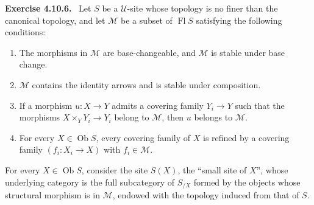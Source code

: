 \documentclass[11pt]{article}
\newcommand{\U}{\mathcal{U}}
\newcommand{\M}{\mathcal{M}}
\newcommand{\Ob}{\operatorname{Ob}}
\newcommand{\Fl}{\operatorname{Fl}}
\newenvironment{remarktext}[1]{\par\medskip\noindent\textbf{#1.}\ }{\par\medskip}
\providecommand{\Ob}{\operatorname{Ob}}
\begin{document}
\begin{remarktext}{Exercise 4.10.6}
Let \(S\) be a \(\U\)-site whose topology is no finer than the canonical topology, and let \(\M\) be a subset of \(\Fl S\) satisfying the following conditions:
\begin{enumerate}[label=\alph*)]
\item The morphisms in \(\M\) are base-changeable, and \(\M\) is stable under base change.
\item \(\M\) contains the identity arrows and is stable under composition.
\item If a morphism \(u:X\to Y\) admits a covering family \(Y_i\to Y\) such that the morphisms \(X\times_YY_i\to Y_i\) belong to \(\M\), then \(u\) belongs to \(\M\).
\item For every \(X\in\Ob S\), every covering family of \(X\) is refined by a covering family \((f_i:X_i\to X)\) with \(f_i\in\M\).
\end{enumerate}
For every \(X\in\Ob S\), consider the site \(S(X)\), the ``small site of \(X\)'', whose underlying category is the full subcategory of \(S_{/X}\) formed by the objects whose structural morphism is in \(\M\), endowed with the topology induced from that of \(S\).


\end{remarktext}
\end{document}
